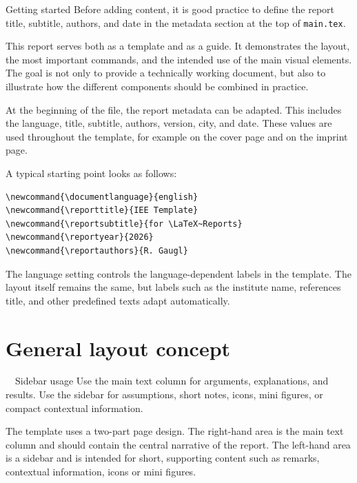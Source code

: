 \documentclass[11pt,a4paper]{report}
\newcommand{\documentlanguage}{english} %
\newcommand{\reporttitle}{IEE Template}
\newcommand{\reportsubtitle}{for \LaTeX~Reports}
\newcommand{\reportyear}{2026}
\newcommand{\reportauthors}{R. Gaugl, A. Author, B. Author}
\begin{document}
\begin{sideNote}[blue]{Getting started}
Before adding content, it is good practice to define the report title, subtitle, authors, and date in the metadata section at the top of \texttt{main.tex}.
\end{sideNote}

This report serves both as a template and as a guide. It demonstrates the layout, the most important commands, and the intended use of the main visual elements. The goal is not only to provide a technically working document, but also to illustrate how the different components should be combined in practice.

At the beginning of the file, the report metadata can be adapted. This includes the language, title, subtitle, authors, version, city, and date. These values are used throughout the template, for example on the cover page and on the imprint page.



A typical starting point looks as follows:

\begin{coloredBlock}[grey]{}
\begin{verbatim}
\newcommand{\documentlanguage}{english}
\newcommand{\reporttitle}{IEE Template}
\newcommand{\reportsubtitle}{for \LaTeX~Reports}
\newcommand{\reportyear}{2026}
\newcommand{\reportauthors}{R. Gaugl}
\end{verbatim}
\end{coloredBlock}

The language setting controls the language-dependent labels in the template. The layout itself remains the same, but labels such as the institute name, references title, and other predefined texts adapt automatically.

\section{General layout concept}

\begin{sideBlock}[yellow]{~~Sidebar usage}
Use the main text column for arguments, explanations, and results. Use the sidebar for assumptions, short notes, icons, mini figures, or compact contextual information.
\end{sideBlock}

The template uses a two-part page design. The right-hand area is the main text column and should contain the central narrative of the report. The left-hand area is a sidebar and is intended for short, supporting content such as remarks, contextual information, icons or mini figures.
\end{document}
